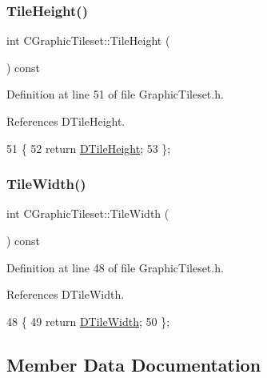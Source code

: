 \subsubsection{\texorpdfstring{Tile\+Height()}{TileHeight()}}
{\footnotesize\ttfamily int C\+Graphic\+Tileset\+::\+Tile\+Height (\begin{DoxyParamCaption}{ }\end{DoxyParamCaption}) const\hspace{0.3cm}{\ttfamily [inline]}}



Definition at line 51 of file Graphic\+Tileset.\+h.



References D\+Tile\+Height.


\begin{DoxyCode}
51                               \{
52             \textcolor{keywordflow}{return} \hyperlink{classCGraphicTileset_af48f32e07d5fe69afd5f764318cc3244}{DTileHeight};
53         \};
\end{DoxyCode}
\hypertarget{classCGraphicTileset_af53f4cda22019c25b1f6ce05d5a1bdcd}{}\label{classCGraphicTileset_af53f4cda22019c25b1f6ce05d5a1bdcd} 
\subsubsection{\texorpdfstring{Tile\+Width()}{TileWidth()}}
{\footnotesize\ttfamily int C\+Graphic\+Tileset\+::\+Tile\+Width (\begin{DoxyParamCaption}{ }\end{DoxyParamCaption}) const\hspace{0.3cm}{\ttfamily [inline]}}



Definition at line 48 of file Graphic\+Tileset.\+h.



References D\+Tile\+Width.


\begin{DoxyCode}
48                              \{
49             \textcolor{keywordflow}{return} \hyperlink{classCGraphicTileset_a2d0c7d19865b81911a3a43d5cae50e00}{DTileWidth};
50         \};
\end{DoxyCode}


\subsection{Member Data Documentation}
\hypertarget{classCGraphicTileset_a3761aec1b9a8bf189da5a7202d7fcac9}{}\label{classCGraphicTileset_a3761aec1b9a8bf189da5a7202d7fcac9} 

